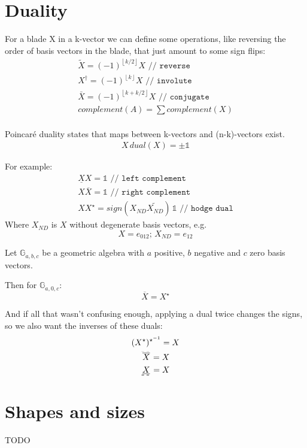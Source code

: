 \documentclass[twoside]{article}
\newcommand{\plusminus}{\pm}
\newcommand{\floor}[1]{{\left\lfloor{#1}\right\rfloor}}
\newcommand{\overdash}[1]{%
        \tikz[baseline=(todotted.base)]{
            \node[inner sep=1pt,outer sep=0pt] (todotted) {$#1$};
            \draw[dashed, line width=0.05mm] (todotted.north west) -- (todotted.north east);
        }%
    }
\newcommand{\underdash}[1]{%
        \tikz[baseline=(todotted.base)]{
            \node[inner sep=1pt,outer sep=0pt] (todotted) {$#1$};
            \draw[dashed, line width=0.2mm] (todotted.south west) -- (todotted.south east);
        }%
    }
\begin{document}
\begin{multicols*}{2}
        \section{Duality}
            \par
                For a blade X in a k-vector we can define some operations,
                like reversing the order of basis vectors in the blade,
                that just amount to some sign flips:
                \begin{gather*}
                    \tilde{X} = (-1)^\floor{k/2} X \texttt{ // reverse} \\
                    X^\dagger = (-1)^\floor{k} X \texttt{ // involute} \\
                    \bar{X} = (-1)^\floor{k+k/2} X \texttt{ // conjugate} \\
                    complement(A) = \sum complement(X) \\
                \end{gather*}
            \par
                Poincaré duality states that maps between k-vectors and (n-k)-vectors exist.
                \begin{gather*}
                    X \, dual(X) = \plusminus \mathbb{1}
                \end{gather*}
            \par
                For example:
                \begin{gather*}
                    \underline{X} X = \mathbb{1} \texttt{ // left complement} \\
                    X \overline{X} = \mathbb{1} \texttt{ // right complement} \\
                    X X^\star = sign(X_{ND} \widetilde{X_{ND}}) \, \mathbb{1} \texttt{ // hodge dual}
                \end{gather*}
                Where $ X_{ND} $ is $ X $ without degenerate basis vectors, e.g.
                $$ X = e_{012}; \, X_{ND} = e_{12} $$
            \par
                Let $ \mathbb{G}_{a,b,c} $ be a geometric algebra with $ a $ positive,
                $ b $ negative and $ c $ zero basis vectors.
            \par
                Then for $ \mathbb{G}_{a,0,c} $:
                $$ \overline{X} = X^\star $$
            \par
                And if all that wasn't confusing enough, applying a dual twice changes the signs,
                so we also want the inverses of these duals:
                \begin{gather*}
                    (X^\star)^{\star^{-1}} = X \\
                    \overdash{\overline{X}} = X \\
                    \underdash{\underline{X}} = X
                \end{gather*}
        \section{Shapes and sizes}
            \par
                TODO
    \end{multicols*}
\end{document}
